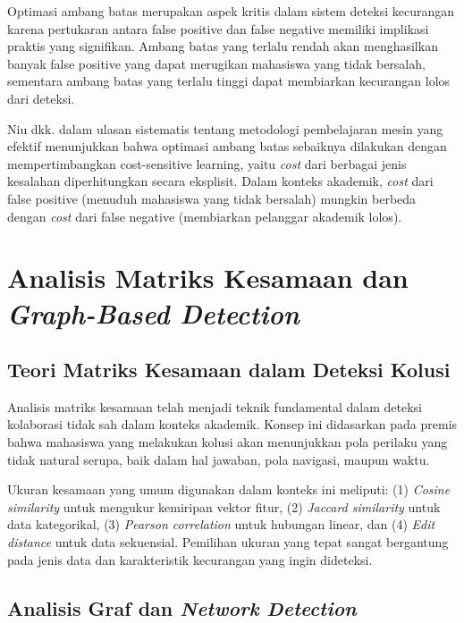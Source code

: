 Optimasi ambang batas merupakan aspek kritis dalam sistem deteksi kecurangan karena pertukaran antara false positive dan false negative memiliki implikasi praktis yang signifikan. Ambang batas yang terlalu rendah akan menghasilkan banyak false positive yang dapat merugikan mahasiswa yang tidak bersalah, sementara ambang batas yang terlalu tinggi dapat membiarkan kecurangan lolos dari deteksi.

Niu dkk. \cite{Niu2025} dalam ulasan sistematis tentang metodologi pembelajaran mesin yang efektif menunjukkan bahwa optimasi ambang batas sebaiknya dilakukan dengan mempertimbangkan cost-sensitive learning, yaitu \textit{cost} dari berbagai jenis kesalahan diperhitungkan secara eksplisit. Dalam konteks akademik, \textit{cost} dari false positive (menuduh mahasiswa yang tidak bersalah) mungkin berbeda dengan \textit{cost} dari false negative (membiarkan pelanggar akademik lolos).

\section{Analisis Matriks Kesamaan dan \textit{Graph-Based Detection}}
\label{sec:similarityAnalysis}

\subsection{Teori Matriks Kesamaan dalam Deteksi Kolusi}

Analisis matriks kesamaan telah menjadi teknik fundamental dalam deteksi kolaborasi tidak sah dalam konteks akademik. Konsep ini didasarkan pada premis bahwa mahasiswa yang melakukan kolusi akan menunjukkan pola perilaku yang tidak natural serupa, baik dalam hal jawaban, pola navigasi, maupun waktu.

Ukuran kesamaan yang umum digunakan dalam konteks ini meliputi: (1) \textit{Cosine similarity} untuk mengukur kemiripan vektor fitur, (2) \textit{Jaccard similarity} untuk data kategorikal, (3) \textit{Pearson correlation} untuk hubungan linear, dan (4) \textit{Edit distance} untuk data sekuensial. Pemilihan ukuran yang tepat sangat bergantung pada jenis data dan karakteristik kecurangan yang ingin dideteksi.

\subsection{Analisis Graf dan \textit{Network Detection}}

